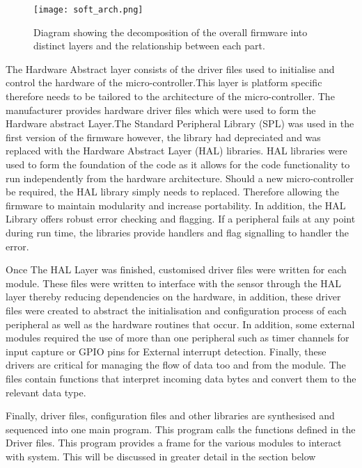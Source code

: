 \begin{figure}[H]
	\centering
	\texttt{[image: soft\_arch.png]}
	\caption{Diagram showing the decomposition of the overall firmware into distinct layers and the relationship between each part.}
	\label{fig:soft_arch}
\end{figure}

The Hardware Abstract layer consists of the driver files used to initialise and control the hardware of the micro-controller.This layer is platform specific therefore needs to be tailored to the architecture of the micro-controller. The manufacturer provides hardware driver files which were used to form the Hardware abstract Layer.The Standard Peripheral Library (SPL) was used in the first version of the firmware however, the library had depreciated and was replaced with the Hardware Abstract Layer (HAL) libraries. HAL libraries were used to form the foundation of the code as it allows for the code functionality to run independently from the hardware architecture. Should a new micro-controller be required, the HAL library simply needs to replaced. Therefore allowing the firmware to maintain modularity and increase portability. In addition, the HAL Library offers robust error checking and flagging. If a peripheral fails at any point during run time, the libraries provide handlers and flag signalling to handler the error. \par 
Once The HAL Layer was finished, customised driver files were written for each module. These files were written to interface with the sensor through the HAL layer thereby reducing dependencies on the hardware, in addition, these driver files were created to abstract the initialisation and configuration process of each peripheral as well as the hardware routines that occur. In addition, some external modules required the use of more than one peripheral such as timer channels for input capture or GPIO pins for External interrupt detection. Finally, these drivers are critical for managing the flow of data too and from the module. The files contain functions that interpret incoming data bytes and convert them to the relevant data type.

\par 

Finally, driver files, configuration files and other libraries are synthesised and sequenced into one main program. This program calls the functions defined in the Driver files. This program provides a frame for the various modules to interact with system. This will be discussed in greater detail in the section below

